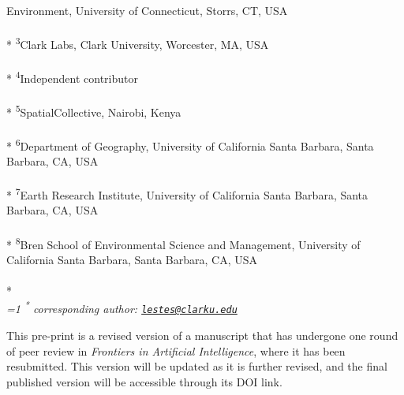 \documentclass[11pt,a4paper]{article}
\begin{document}
\begin{singlespace}
\begin{justify}
Environment, University of Connecticut, Storrs, CT, USA\\\\*
\footnotesize\textsuperscript{3}Clark Labs, Clark University, Worcester,
MA, USA\\\\*
\footnotesize\textsuperscript{4}Independent contributor\\\\*
\footnotesize\textsuperscript{5}SpatialCollective, Nairobi, Kenya\\\\*
\footnotesize\textsuperscript{6}Department of Geography, University of
California Santa Barbara, Santa Barbara, CA, USA\\\\*
\footnotesize\textsuperscript{7}Earth Research Institute, University of
California Santa Barbara, Santa Barbara, CA, USA\\\\*
\footnotesize\textsuperscript{8}Bren School of Environmental Science and
Management, University of California Santa Barbara, Santa Barbara, CA,
USA\\\\*
\setcounter{num}{1}
\\[0.1cm]
\footnotesize \emph{
\ifnum\value{num}=1%
\textsuperscript{*} corresponding author:
\fi
\href{mailto:lestes@clarku.edu}{\nolinkurl{lestes@clarku.edu}}
}

This pre-print is a revised version of a manuscript that has undergone
one round of peer review in \emph{Frontiers in Artificial Intelligence},
where it has been resubmitted. This version will be updated as it is
further revised, and the final published version will be accessible
through its DOI link.


\end{justify}
\normalsize


\end{singlespace}
\end{document}
